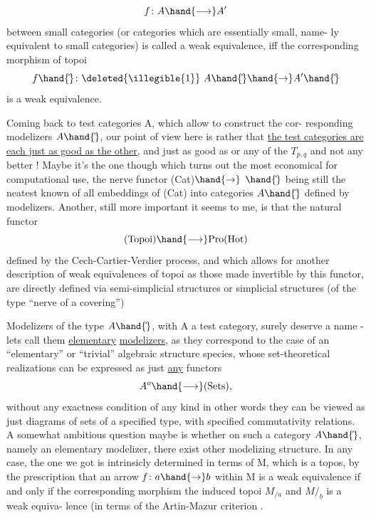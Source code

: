 \[ f\colon A \hand{\longrightarrow} A' \]
between small categories (or categories which are essentially small, name-%
ly equivalent to small categories) is called a weak equivalence, iff the
corresponding morphism of topoi
\[ f\hand{\hat{}}\colon \deleted{\illegible{1}}\ A\hand{\hat{}} \hand{\to} A'\hand{\hat{}} \]
is a weak equivalence.

Coming back to test categories A, which allow to construct the cor-%
responding modelizers $A\hand{\hat{}}$, our point of view here is rather that \uline{the test
categories are each just as good  as the other}, and \hand{$\Delta$} just as good as
\hand{$\Box$} or any of the $T_{p,q}$ and not any better ! Maybe it's the one though which
turns out the most economical for computational use, the nerve functor
(Cat)$\hand{\to}$ \hand{$\Delta$}$\hand{\hat{}}$ being still the neatest known of all  embeddings of (Cat) into
categories $A\hand{\hat{}}$ defined by modelizers. Another, still more important 
it seems to me, is that the natural functor
\[ \text{(Topoi)} \hand{\longrightarrow} \text{Pro(Hot)} \]
defined by the \hand{\v{}}Cech-Cartier-Verdier process, and which allows for another
description of weak equivalences of topoi\hand{,}  as those made invertible by this
functor, are directly defined via semi-simplicial structures or simplicial
structures (of the type ``nerve of a covering'')

Modelizers of the type $A\hand{\hat{}}$, with A a test category, surely deserve
a name - lets call them \uline{elementary} \uline{modelizers}, as they correspond to 
the case of an ``elementary'' or ``trivial'' algebraic structure species,
whose set-theoretical realizations can be expressed as just \uline{any} functors
\[ A^{o} \hand{\longrightarrow} \text{(Sets)} , \]
without any exactness condition of any kind\over{,}{;} in other words they can
be viewed as just diagrams of sets of a specified type, with specified
commutativity relations. A somewhat ambitious question maybe is whether
on such a category  $A\hand{\hat{}}$, namely an elementary modelizer, there   exist
 other modelizing structure. In any case, the one we got is intrinsicly
determined in terms of M, which is a topos, by the prescription that
an arrow $f\colon a \hand{\to} b$ within M is a weak equivalence if and only if the
corresponding morphism   the induced topoi $M_{/a}$ and $M/_{b}$ is a weak equiva-%
lence (in terms of the Artin-Mazur criterion  \hand{)}.

